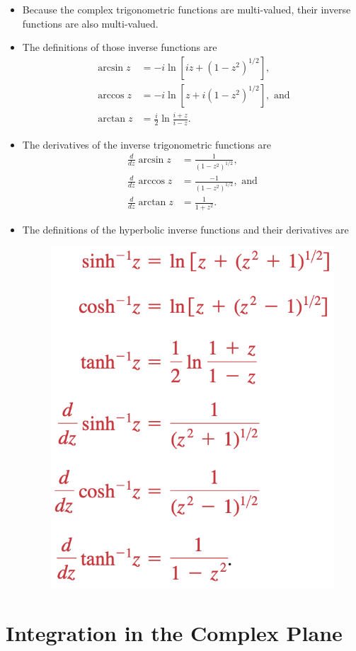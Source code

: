 \documentclass{article}
\begin{document}
\begin{itemize}
  \item Because the complex trigonometric functions are multi-valued, their inverse functions are also multi-valued.

  \item The definitions of those inverse functions are \begin{align*}
          \arcsin z & = -i \ln [i z + (1 - z^2)^{1 / 2}],             \\
          \arccos z & = -i \ln [z + i (1 - z^2)^{1 / 2}], \text{ and} \\
          \arctan z & = \frac{i}{2} \ln \frac{i + z}{i - z}.
        \end{align*}

  \item The derivatives of the inverse trigonometric functions are \begin{align*}
          \frac{d}{d z} \arcsin z & = \frac{1}{(1 - z^2)^{1 / 2}},              \\
          \frac{d}{d z} \arccos z & = \frac{-1}{(1 - z^2)^{1 / 2}}, \text{ and} \\
          \frac{d}{d z} \arctan z & = \frac{1}{1 + z^2}.
        \end{align*}

  \item The definitions of the hyperbolic inverse functions and their derivatives are

        \begin{figure}[H]
          \centering
          \includegraphics[width=0.4 \textwidth]{inverse-hyperbolic-functions}
        \end{figure}
\end{itemize}

\section{Integration in the Complex Plane}
\end{document}
